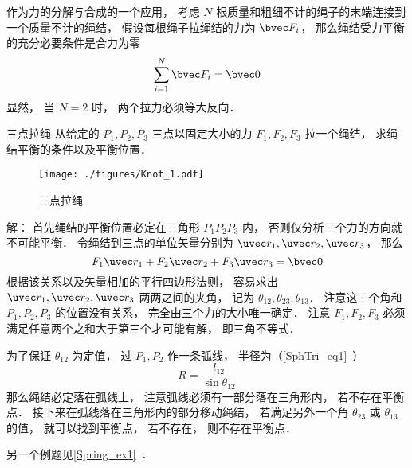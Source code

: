 

作为力的分解与合成的一个应用， 考虑 $N$ 根质量和粗细不计的绳子的末端连接到一个质量不计的绳结， 假设每根绳子拉绳结的力为 $\bvec F_i$， 那么绳结受力平衡的充分必要条件是合力为零
\begin{equation}
\sum_{i=1}^N \bvec F_i = \bvec 0
\end{equation}
显然， 当 $N = 2$ 时， 两个拉力必须等大反向．

\begin{example}{三点拉绳}
从给定的 $P_1,P_2,P_3$ 三点以固定大小的力 $F_1, F_2, F_3$ 拉一个绳结， 求绳结平衡的条件以及平衡位置．
\begin{figure}[ht]
\centering
\texttt{[image: ./figures/Knot\_1.pdf]}
\caption{三点拉绳} \label{Knot_fig1}
\end{figure}

解： 首先绳结的平衡位置必定在三角形 $P_1 P_2 P_3$ 内， 否则仅分析三个力的方向就不可能平衡． 令绳结到三点的单位矢量分别为 $\uvec r_1, \uvec r_2, \uvec r_3$， 那么
\begin{equation}
F_1 \uvec r_1 + F_2 \uvec r_2 + F_3 \uvec r_3 = \bvec 0
\end{equation}
根据该关系以及矢量相加的平行四边形法则， 容易求出 $\uvec r_1, \uvec r_2, \uvec r_3$ 两两之间的夹角， 记为 $\theta_{12}, \theta_{23}, \theta_{13}$． 注意这三个角和 $P_1, P_2, P_3$ 的位置没有关系， 完全由三个力的大小唯一确定． 注意 $F_1, F_2, F_3$ 必须满足任意两个之和大于第三个才可能有解， 即三角不等式．

为了保证 $\theta_{12}$ 为定值， 过 $P_1, P_2$ 作一条弧线， 半径为（\autoref{SphTri_eq1}~）
\begin{equation}
R = \frac{l_{12}}{\sin\theta_{12}}
\end{equation}
那么绳结必定落在弧线上， 注意弧线必须有一部分落在三角形内， 若不存在平衡点． 接下来在弧线落在三角形内的部分移动绳结， 若满足另外一个角 $\theta_{23}$ 或 $\theta_{13}$ 的值， 就可以找到平衡点， 若不存在， 则不存在平衡点．
\end{example}

另一个例题见\autoref{Spring_ex1}~．
